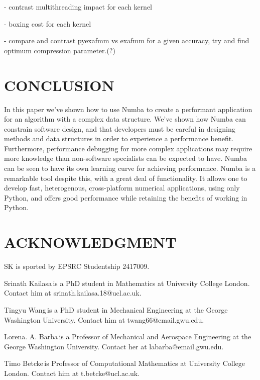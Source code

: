 \documentclass{IEEEcsmag}
\begin{document}
- contrast multithreading impact for each kernel

- boxing cost for each kernel

- compare and contrast pyexafmm vs exafmm for a given accuracy, try and find optimum compression parameter.(?)

\section{CONCLUSION}

In this paper we've shown how to use Numba to create a performant application for an algorithm with a complex data structure. We've shown how Numba can constrain software design, and that developers must be careful in designing methods and data structures in order to experience a performance benefit. Furthermore, performance debugging for more complex applications may require more knowledge than non-software specialists can be expected to have. Numba can be seen to have its own learning curve for achieving performance. Numba is a remarkable tool despite this, with a great deal of functionality. It allows one to develop fast, heterogenous, cross-platform numerical applications, using only Python, and offers good performance while retaining the benefits of working in Python.

\section{ACKNOWLEDGMENT}

SK is sported by EPSRC Studentship 2417009.





\begin{IEEEbiography}{Srinath Kailasa}{\,}is a PhD student in Mathematics at University College London. Contact him at srinath.kailasa.18@ucl.ac.uk.
\end{IEEEbiography}

\begin{IEEEbiography}{Tingyu Wang}{\,}is a PhD student in Mechanical Engineering at the George Washington University. Contact him at twang66@email.gwu.edu.
\end{IEEEbiography}

\begin{IEEEbiography}{Lorena. A. Barba}{\,}is a Professor of Mechanical and Aerospace Engineering at the George Washington University.  Contact her at labarba@email.gwu.edu.
\end{IEEEbiography}

\begin{IEEEbiography}{Timo Betcke}{\,}is Professor of Computational Mathematics at University College London. Contact him at t.betcke@ucl.ac.uk.
\end{IEEEbiography}
\end{document}
